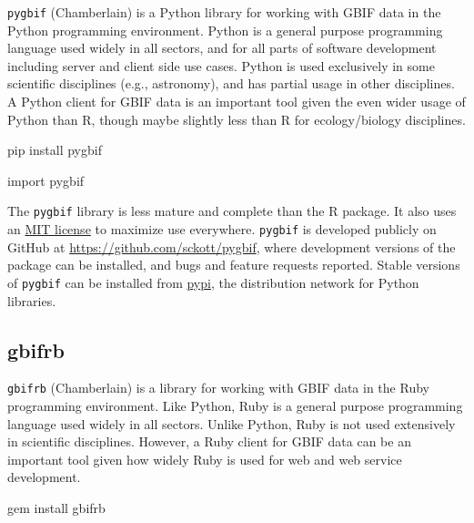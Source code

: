 \documentclass[3p]{elsarticle} %
\newenvironment{Shaded}{\begin{snugshade}}{\end{snugshade}}
\newcommand{\ImportTok}[1]{#1}
\newcommand{\NormalTok}[1]{#1}
\begin{document}
\texttt{pygbif} (Chamberlain) is a Python library for working with GBIF
data in the Python programming environment. Python is a general purpose
programming language used widely in all sectors, and for all parts of
software development including server and client side use cases. Python
is used exclusively in some scientific disciplines (e.g., astronomy),
and has partial usage in other disciplines. A Python client for GBIF
data is an important tool given the even wider usage of Python than R,
though maybe slightly less than R for ecology/biology disciplines.

\begin{Shaded}
\begin{Highlighting}[]
\NormalTok{pip install pygbif}
\end{Highlighting}
\end{Shaded}

\begin{Shaded}
\begin{Highlighting}[]
\ImportTok{import}\NormalTok{ pygbif}
\end{Highlighting}
\end{Shaded}

The \texttt{pygbif} library is less mature and complete than the R
package. It also uses an
\href{https://choosealicense.com/licenses/mit/}{MIT license} to maximize
use everywhere. \texttt{pygbif} is developed publicly on GitHub at
\url{https://github.com/sckott/pygbif}, where development versions of
the package can be installed, and bugs and feature requests reported.
Stable versions of \texttt{pygbif} can be installed from
\href{https://pypi.python.org/pypi/pygbif}{pypi}, the distribution
network for Python libraries.

\hypertarget{gbifrb}{%
\subsection{gbifrb}\label{gbifrb}}

\texttt{gbifrb} (Chamberlain) is a library for working with GBIF data in
the Ruby programming environment. Like Python, Ruby is a general purpose
programming language used widely in all sectors. Unlike Python, Ruby is
not used extensively in scientific disciplines. However, a Ruby client
for GBIF data can be an important tool given how widely Ruby is used for
web and web service development.

\begin{Shaded}
\begin{Highlighting}[]
\NormalTok{gem install gbifrb}
\end{Highlighting}
\end{Shaded}
\end{document}
